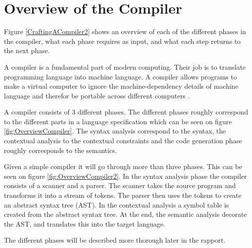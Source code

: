 \section{Overview of the Compiler}


Figure \ref{CraftingACompiler2} shows an overview of each of the different phases in the compiler, what each phase requires as input, and what each step returns to the next phase.

A compiler is a fundamental part of modern computing. Their job is to translate programming language into machine language. A compiler allows programs to make a virtual computer to ignore the machine-dependency details of machine language and therefor be portable across different computers  \citep{CraftingACompiler}.


A compiler consists of 3 different phases. The different phases roughly correspond to the different parts in a language specification which can be seen on figure \ref{fig:OverviewCompiler}. The syntax analysis correspond to the syntax, the contextual analysis to the contextual constraints and the code generation phase roughly corresponds to the semantics.

Given a simple compiler it will go through more than three phases. This can be seen on figure \ref{fig:OverviewCompiler2}. In the syntax analysis phase the compiler consists of a scanner and a parser. The scanner takes the source program and transforms it into a stream of tokens. The parser then uses the tokens to create an abstract syntax tree (AST). In the contextual analysis a symbol table is created from the abstract syntax tree. At the end, the semantic analysis decorate the AST, and translates this into the target language.

The different phases will be described more thorough later in the rapport. 